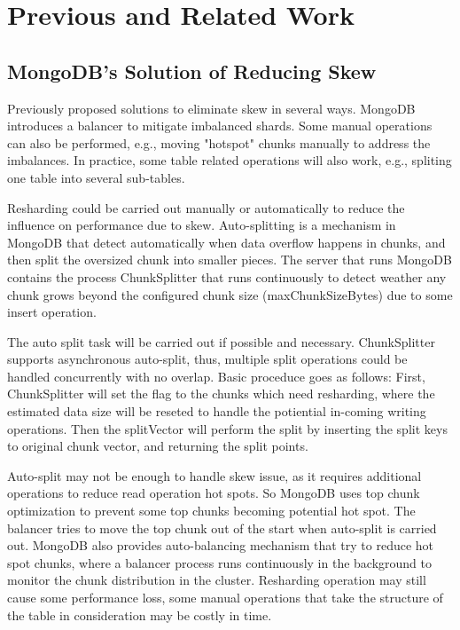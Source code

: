 \documentclass[a4paper,10pt,twoside]{article}
\begin{document}
\section{Previous and Related Work}

\subsection{MongoDB's Solution of Reducing Skew}

Previously proposed solutions to eliminate skew in several ways.
MongoDB introduces a balancer to mitigate imbalanced shards\cite{MongoDB_balancing1}.
Some manual operations can also be performed, e.g., moving "hotspot" chunks manually to address the imbalances. 
In practice, some table related operations will also work, e.g., spliting one table into several sub-tables.
\par
Resharding could be carried out manually or automatically to reduce the influence on performance due to skew.
Auto-splitting is a mechanism in MongoDB\cite{MongoDB_sharding1} that detect automatically when data overflow happens in chunks, 
and then split the oversized chunk into smaller pieces.
The server that runs MongoDB contains the process ChunkSplitter that runs continuously to detect weather any chunk grows beyond the configured chunk size (maxChunkSizeBytes) due to some insert operation.
\par
The auto split task will be carried out if possible and necessary. ChunkSplitter supports asynchronous auto-split, thus, 
multiple split operations could be handled concurrently with no overlap. 
Basic proceduce goes as follows: 
First, ChunkSplitter will set the flag to the chunks which need resharding, where the estimated data size will be reseted to handle the potiential in-coming writing operations.
Then the splitVector will perform the split by inserting the split keys to original chunk vector, and returning the split points.
\par
Auto-split may not be enough to handle skew issue, as it requires additional operations to reduce read operation hot spots.
So MongoDB uses top chunk optimization to prevent some top chunks becoming potential hot spot.
The balancer tries to move the top chunk out of the start when auto-split is carried out.
MongoDB also provides auto-balancing mechanism that try to reduce hot spot chunks, where a balancer process runs continuously in the background to monitor the chunk distribution in the cluster.
Resharding operation may still cause some performance loss, some manual operations that take the structure of the table in consideration may be costly in time.
\end{document}
